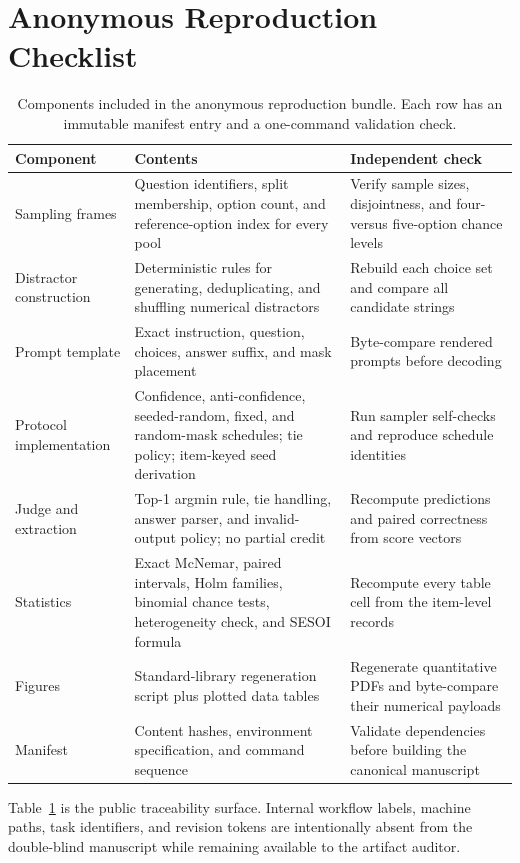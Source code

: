 \section{Anonymous Reproduction Checklist}
\label{app:repro}

\begin{table}[H]
\centering
\small
\setlength{\tabcolsep}{4pt}
\caption{Components included in the anonymous reproduction bundle.  Each row
has an immutable manifest entry and a one-command validation check.}
\label{tab:repro-checklist}
\begin{tabularx}{\textwidth}{@{}p{}XX@{}}
\toprule
Component & Contents & Independent check \\
\midrule
Sampling frames & Question identifiers, split membership, option count, and
reference-option index for every pool & Verify sample sizes, disjointness, and
four- versus five-option chance levels \\
Distractor construction & Deterministic rules for generating, deduplicating,
and shuffling numerical distractors & Rebuild each choice set and compare all
candidate strings \\
Prompt template & Exact instruction, question, choices, answer suffix, and
mask placement & Byte-compare rendered prompts before decoding \\
Protocol implementation & Confidence, anti-confidence, seeded-random, fixed,
and random-mask schedules; tie policy; item-keyed seed derivation & Run sampler
self-checks and reproduce schedule identities \\
Judge and extraction & Top-1 argmin rule, tie handling, answer parser, and
invalid-output policy; no partial credit & Recompute predictions and paired
correctness from score vectors \\
Statistics & Exact McNemar, paired intervals, Holm families, binomial chance
tests, heterogeneity check, and SESOI formula & Recompute every table cell from
the item-level records \\
Figures & Standard-library regeneration script plus plotted data tables &
Regenerate quantitative PDFs and byte-compare their numerical payloads \\
Manifest & Content hashes, environment specification, and command sequence &
Validate dependencies before building the canonical manuscript \\
\bottomrule
\end{tabularx}
\end{table}

Table~\ref{tab:repro-checklist} is the public traceability surface.  Internal workflow labels,
machine paths, task identifiers, and revision tokens are intentionally absent
from the double-blind manuscript while remaining available to the artifact
auditor.
